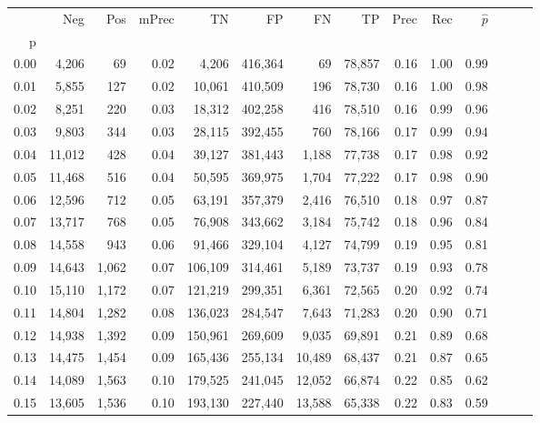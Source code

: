 \begin{tabular}{rrrrrrrrrrrrrr}
\toprule
{} &     Neg &    Pos & mPrec &       TN &       FP &      FN &      TP &  Prec &   Rec & $\hat{p}$ \\
p    &         &        &       &          &          &         &         &       &       &           \\
\midrule
0.00 &   4,206 &     69 &  0.02 &    4,206 &  416,364 &      69 &  78,857 &  0.16 &  1.00 &      0.99 \\
0.01 &   5,855 &    127 &  0.02 &   10,061 &  410,509 &     196 &  78,730 &  0.16 &  1.00 &      0.98 \\
0.02 &   8,251 &    220 &  0.03 &   18,312 &  402,258 &     416 &  78,510 &  0.16 &  0.99 &      0.96 \\
0.03 &   9,803 &    344 &  0.03 &   28,115 &  392,455 &     760 &  78,166 &  0.17 &  0.99 &      0.94 \\
0.04 &  11,012 &    428 &  0.04 &   39,127 &  381,443 &   1,188 &  77,738 &  0.17 &  0.98 &      0.92 \\
0.05 &  11,468 &    516 &  0.04 &   50,595 &  369,975 &   1,704 &  77,222 &  0.17 &  0.98 &      0.90 \\
0.06 &  12,596 &    712 &  0.05 &   63,191 &  357,379 &   2,416 &  76,510 &  0.18 &  0.97 &      0.87 \\
0.07 &  13,717 &    768 &  0.05 &   76,908 &  343,662 &   3,184 &  75,742 &  0.18 &  0.96 &      0.84 \\
0.08 &  14,558 &    943 &  0.06 &   91,466 &  329,104 &   4,127 &  74,799 &  0.19 &  0.95 &      0.81 \\
0.09 &  14,643 &  1,062 &  0.07 &  106,109 &  314,461 &   5,189 &  73,737 &  0.19 &  0.93 &      0.78 \\
0.10 &  15,110 &  1,172 &  0.07 &  121,219 &  299,351 &   6,361 &  72,565 &  0.20 &  0.92 &      0.74 \\
0.11 &  14,804 &  1,282 &  0.08 &  136,023 &  284,547 &   7,643 &  71,283 &  0.20 &  0.90 &      0.71 \\
0.12 &  14,938 &  1,392 &  0.09 &  150,961 &  269,609 &   9,035 &  69,891 &  0.21 &  0.89 &      0.68 \\
0.13 &  14,475 &  1,454 &  0.09 &  165,436 &  255,134 &  10,489 &  68,437 &  0.21 &  0.87 &      0.65 \\
0.14 &  14,089 &  1,563 &  0.10 &  179,525 &  241,045 &  12,052 &  66,874 &  0.22 &  0.85 &      0.62 \\
0.15 &  13,605 &  1,536 &  0.10 &  193,130 &  227,440 &  13,588 &  65,338 &  0.22 &  0.83 &      0.59 \\

\end{tabular}
